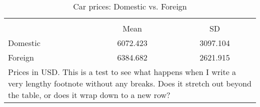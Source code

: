 \begin{table}[htbp]\centering
\caption{Car prices: Domestic vs. Foreign}
\def\sym#1{\ifmmode^{#1}\else\(^{#1}\)\fi}
\begin{tabular} {l*{1}{cc}}
\toprule 
&\multicolumn{2}{c}{}          \\
& Mean & SD                            \\
\midrule
Domestic &  6072.423 &  3097.104\\
Foreign &  6384.682 &  2621.915\\
\bottomrule
\multicolumn{3}{p{4.5in}}{\footnotesize Prices in USD. This is a test to see what happens when I write a very lengthy footnote without any breaks. Does it stretch out beyond the table, or does it wrap down to a new row?} \\
\end{tabular}
\end{table}
